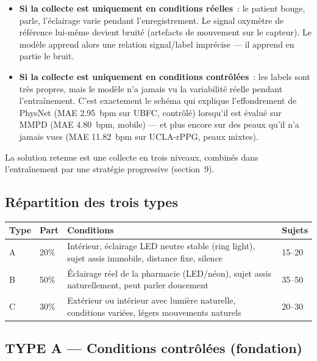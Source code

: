 \documentclass[11pt,a4paper]{article}
\begin{document}
\begin{itemize}
\item \textbf{Si la collecte est uniquement en conditions r\'eelles}~: le
patient bouge, parle, l'\'eclairage varie pendant l'enregistrement. Le signal
oxym\`etre de r\'ef\'erence lui-m\^eme devient bruit\'e (artefacts de
mouvement sur le capteur). Le mod\`ele apprend alors une relation
signal/label impr\'ecise --- il apprend en partie le bruit.
\item \textbf{Si la collecte est uniquement en conditions contr\^ol\'ees}~:
les labels sont tr\`es propres, mais le mod\`ele n'a jamais vu la
variabilit\'e r\'eelle pendant l'entra\^inement. C'est exactement le
sch\'ema qui explique l'effondrement de PhysNet (MAE 2.95~bpm sur UBFC,
contr\^ol\'e) lorsqu'il est \'evalu\'e sur MMPD (MAE 4.80~bpm, mobile) ---
et plus encore sur des peaux qu'il n'a jamais vues (MAE 11.82~bpm sur
UCLA-rPPG, peaux mixtes).
\end{itemize}

La solution retenue est une collecte en trois niveaux, combin\'es dans
l'entra\^inement par une strat\'egie progressive (section~9).

\subsection{R\'epartition des trois types}

\begin{center}
\begin{tabularx}{\textwidth}{P{1.6cm} P{1.2cm} X P{1.6cm}}
\toprule
\textbf{Type} & \textbf{Part} & \textbf{Conditions} & \textbf{Sujets} \\
\midrule
A & 20\% & Int\'erieur, \'eclairage LED neutre stable (ring light), sujet
assis immobile, distance fixe, silence & 15--20 \\
B & 50\% & \'Eclairage r\'eel de la pharmacie (LED/n\'eon), sujet assis
naturellement, peut parler doucement & 35--50 \\
C & 30\% & Ext\'erieur ou int\'erieur avec lumi\`ere naturelle, conditions
vari\'ees, l\'egers mouvements naturels & 20--30 \\
\bottomrule
\end{tabularx}
\end{center}

\subsection{TYPE A --- Conditions contr\^ol\'ees (fondation)}
\end{document}

